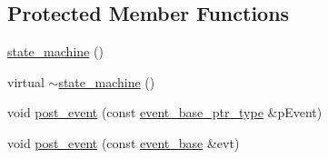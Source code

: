 \subsection*{Protected Member Functions}
\begin{DoxyCompactItemize}
\item 
\mbox{\hyperlink{classboost_1_1statechart_1_1state__machine_add3649c5baab6017a094ae563d6075b6}{state\+\_\+machine}} ()
\item 
virtual \mbox{\hyperlink{classboost_1_1statechart_1_1state__machine_abd03251def3e351d14451e6b8ffd73b4}{$\sim$state\+\_\+machine}} ()
\item 
void \mbox{\hyperlink{classboost_1_1statechart_1_1state__machine_ab0b16e3139d505968f463861913850ed}{post\+\_\+event}} (const \mbox{\hyperlink{classboost_1_1statechart_1_1state__machine_aa2f1c567e2d1a66786d28769312dfa08}{event\+\_\+base\+\_\+ptr\+\_\+type}} \&p\+Event)
\item 
void \mbox{\hyperlink{classboost_1_1statechart_1_1state__machine_affa0211ad348886e2f01e8ec1cc55654}{post\+\_\+event}} (const \mbox{\hyperlink{classboost_1_1statechart_1_1event__base}{event\+\_\+base}} \&evt)
\end{DoxyCompactItemize}
